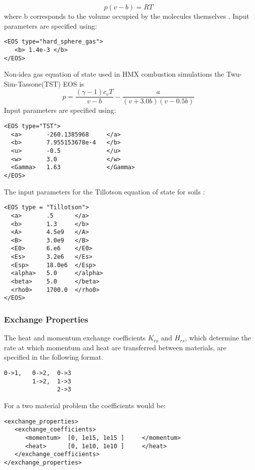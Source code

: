 %
\begin{equation}
  p(v - b) = RT
\end{equation}
%
where b corresponds to the volume occupied by the molecules themselves \cite{ref:thompson}.
Input parameters are specified using:
%
\begin{Verbatim}[fontsize=\footnotesize]
<EOS type="hard_sphere_gas">
   <b> 1.4e-3 </b>
</EOS>
\end{Verbatim}
%
%
Non-idea gas equation of state used in HMX combustion simulations the Twu-Sim-Tassone(TST) EOS
is
\begin{equation}
  p = \frac{ (\gamma -1)c_v T }{ v - b} - \frac{ a }{(v+3.0b)(v-0.5b)}
\end{equation}
%
Input parameters are specified using:
%
\begin{Verbatim}[fontsize=\footnotesize]
<EOS type="TST">
  <a>       -260.1385968     </a>
  <b>       7.955153678e-4   </b>
  <u>       -0.5             </u>
  <w>       3.0              </w>
  <Gamma>   1.63             </Gamma>
</EOS>
\end{Verbatim}
%
%
The input parameters for the Tillotson equation of state \cite{ref:gathers} for soils :
%
\begin{Verbatim}[fontsize=\footnotesize]
<EOS type = "Tillotson">
  <a>       .5      </a>
  <b>       1.3     </b>
  <A>       4.5e9   </A>
  <B>       3.0e9   </B>
  <E0>      6.e6    </E0>
  <Es>      3.2e6   </Es>
  <Esp>     18.0e6  </Esp>
  <alpha>   5.0     </alpha>
  <beta>    5.0     </beta>
  <rho0>    1700.0  </rho0>
</EOS>
\end{Verbatim}
%
\subsubsection{Exchange Properties}
The heat and momentum exchange coefficients $K_{rs}$ and $H_{rs}$, which determine the rate at which momentum and heat are transferred between materials, are specified in the following format.
%
\begin{Verbatim}[fontsize=\footnotesize]
0->1,   0->2,  0->3
        1->2,  1->3
               2->3
\end{Verbatim}
%
For a two material problem the coefficients would be:
%
\begin{Verbatim}[fontsize=\footnotesize]
<exchange_properties> 
   <exchange_coefficients>
      <momentum>  [0, 1e15, 1e15 ]     </momentum>
      <heat>      [0, 1e10, 1e10 ]     </heat>  
   </exchange_coefficients>
</exchange_properties>
\end{Verbatim}
%
%
